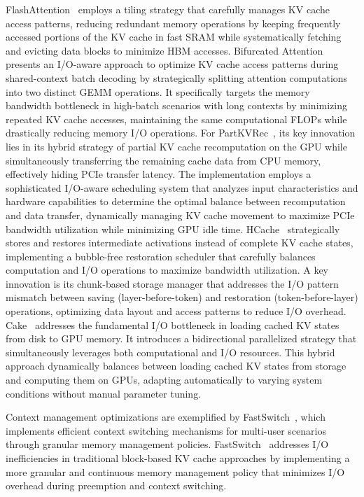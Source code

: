 FlashAttention~\cite{DBLP:conf/nips/DaoFERR22} employs a tiling strategy that carefully manages KV cache access patterns, reducing redundant memory operations by keeping frequently accessed portions of the KV cache in fast SRAM while systematically fetching and evicting data blocks to minimize HBM accesses. 
Bifurcated Attention~\cite{athiwaratkun2024bifurcatedattentionacceleratingmassively} presents an I/O-aware approach to optimize KV cache access patterns during shared-context batch decoding by strategically splitting attention computations into two distinct GEMM operations. It specifically targets the memory bandwidth bottleneck in high-batch scenarios with long contexts by minimizing repeated KV cache accesses, maintaining the same computational FLOPs while drastically reducing memory I/O operations. 
For PartKVRec~\cite{jiang2024efficientllminferenceioaware}, its key innovation lies in its hybrid strategy of partial KV cache recomputation on the GPU while simultaneously transferring the remaining cache data from CPU memory, effectively hiding PCIe transfer latency. The implementation employs a sophisticated I/O-aware scheduling system that analyzes input characteristics and hardware capabilities to determine the optimal balance between recomputation and data transfer, dynamically managing KV cache movement to maximize PCIe bandwidth utilization while minimizing GPU idle time. 
HCache~\cite{DBLP:journals/corr/abs-2410-05004} strategically stores and restores intermediate activations instead of complete KV cache states, implementing a bubble-free restoration scheduler that carefully balances computation and I/O operations to maximize bandwidth utilization. A key innovation is its chunk-based storage manager that addresses the I/O pattern mismatch between saving (layer-before-token) and restoration (token-before-layer) operations, optimizing data layout and access patterns to reduce I/O overhead.
Cake~\cite{jin2024computeloadkvcache} addresses the fundamental I/O bottleneck in loading cached KV states from disk to GPU memory. It introduces a bidirectional parallelized strategy that simultaneously leverages both computational and I/O resources. This hybrid approach dynamically balances between loading cached KV states from storage and computing them on GPUs, adapting automatically to varying system conditions without manual parameter tuning. 

Context management optimizations are exemplified by FastSwitch~\cite{shen2024fastswitchoptimizingcontextswitching}, which implements efficient context switching mechanisms for multi-user scenarios through granular memory management policies. 
FastSwitch~\cite{shen2024fastswitchoptimizingcontextswitching} addresses I/O inefficiencies in traditional block-based KV cache approaches by implementing a more granular and continuous memory management policy that minimizes I/O overhead during preemption and context switching. 

